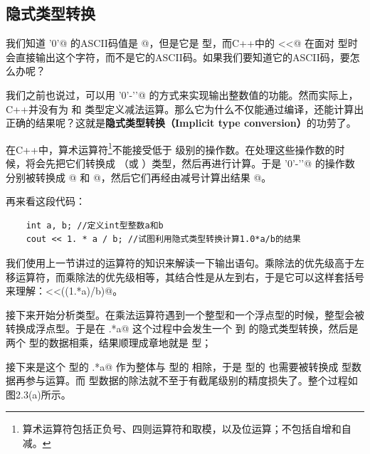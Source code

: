 \subsection*{隐式类型转换}
我们知道 \lstinline@'0'@ 的ASCII码值是 @，但是它是 \lstinline@char@ 型，而C++中的 \lstinline@cout<<@ 在面对 \lstinline@char@ 型时会直接输出这个字符，而不是它的ASCII码。如果我们要知道它的ASCII码，要怎么办呢？\par
我们之前也说过，可以用 \lstinline@'0'-'\0'@ 的方式来实现输出整数值的功能。然而实际上，C++并没有为 \lstinline@char@ 和 \lstinline@char@ 类型定义减法运算。那么它为什么不仅能通过编译，还能计算出正确的结果呢？这就是\textbf{隐式类型转换（Implicit type conversion）}的功劳了。\par
在C++中，算术运算符\footnote{算术运算符包括正负号、四则运算符和取模，以及位运算；不包括自增和自减。}不能接受低于 \lstinline@int@ 级别的操作数。在处理这些操作数的时候，将会先把它们转换成 \lstinline@int@（或 \lstinline@unsigned@）类型，然后再进行计算。于是 \lstinline@'0'-'\0'@ 的操作数分别被转换成 @ 和 @，然后它们再经由减号计算出结果 @。\par
再来看这段代码：
\begin{lstlisting}
    int a, b; //定义int型整数a和b
    cout << 1. * a / b; //试图利用隐式类型转换计算1.0*a/b的结果
\end{lstlisting}
我们使用上一节讲过的运算符的知识来解读一下输出语句。乘除法的优先级高于左移运算符，而乘除法的优先级相等，其结合性是从左到右，于是它可以这样套括号来理解：\lstinline@cout<<((1.*a)/b)@。\par
接下来开始分析类型。在乘法运算符遇到一个整型和一个浮点型的时候，整型会被转换成浮点型。于是在 .*a@ 这个过程中会发生一个 \lstinline@int@ 到 \lstinline@double@ 的隐式类型转换，然后是两个 \lstinline@double@ 型的数据相乘，结果顺理成章地就是 \lstinline@double@ 型；\par
接下来是这个 \lstinline@double@ 型的 .*a@ 作为整体与 \lstinline@int@ 型的 \lstinline@b@ 相除，于是 \lstinline@int@ 型的 \lstinline@b@ 也需要被转换成 \lstinline@double@ 型数据再参与运算。而 \lstinline@double@ 型数据的除法就不至于有截尾级别的精度损失了。整个过程如图2.3(a)所示。\par

